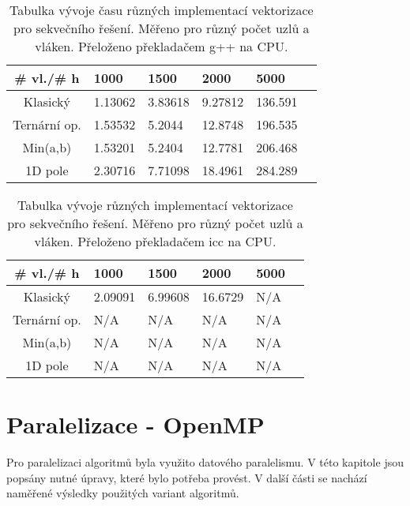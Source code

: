 \documentclass[a4paper,11pt]{article}
\begin{document}
     \begin{table}[ht]
  \begin{center}
   \begin{tabular}{|c|l|l|l|l|l|}
    \hline 
    \# vl./\# h & 1000 & 1500 & 2000 & 5000 \\
   \hline 
   \hline 
   Klasický & 1.13062 & 3.83618 & 9.27812 & 136.591 \\
   \hline
    Ternární op. & 1.53532 & 5.2044 & 12.8748 & 196.535 \\
   \hline
    Min(a,b) & 1.53201 & 5.2404 & 12.7781 & 206.468 \\
   \hline
    1D pole & 2.30716 & 7.71098 & 18.4961 & 284.289 \\
   \hline        
   \hline
    \end{tabular}
   \caption{Tabulka vývoje času různých implementací vektorizace pro sekvečního řešení. Měřeno pro různý počet uzlů a vláken. Přeloženo 
   překladačem g++ na CPU.} 
   \label{tab.tab30}
  \end{center}   
  \end{table}

       \begin{table}[ht]
  \begin{center}
   \begin{tabular}{|c|l|l|l|l|l|}
    \hline 
    \# vl./\# h & 1000 & 1500 & 2000 & 5000 \\
   \hline 
   \hline 
   Klasický & 2.09091 & 6.99608 & 16.6729 & N/A \\
   \hline
    Ternární op. & N/A & N/A & N/A & N/A \\
   \hline
    Min(a,b) & N/A & N/A & N/A & N/A \\
   \hline
    1D pole & N/A & N/A & N/A & N/A \\
   \hline        
   \hline
    \end{tabular}
   \caption{Tabulka vývoje různých implementací vektorizace pro sekvečního řešení. Měřeno pro různý počet uzlů a vláken. Přeloženo 
   překladačem icc na CPU.} 
   \label{tab.tab31}
  \end{center}  
  \end{table}
  
\section{Paralelizace - OpenMP}
Pro paralelizaci algoritmů byla využito datového paralelismu. V této kapitole jsou popsány nutné úpravy, které bylo potřeba provést. V další části se nachází naměřené
výsledky použitých variant algoritmů.
\end{document}
